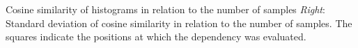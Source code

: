     \label{fig:cosine}
    Cosine similarity of histograms in relation to the number of
    samples \emph{Right}: Standard deviation of cosine similarity in
    relation to the number of samples. The squares indicate the
    positions at which the dependency was evaluated.%
